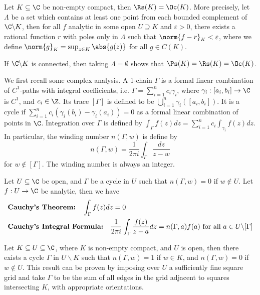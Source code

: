 \documentclass[a4paper]{article}
\begin{document}
\begin{nthm}\label{thm:Runge}
  Let $K\subseteq\C$ be non-empty compact, then $\Rs(K)=\Oc(K)$. More precisely, let $\Lambda$ be a set which contains at least one point from each bounded complement of $\C\backslash K$, then for all $f$ analytic in some open $U\supseteq K$ and $\varepsilon>0$, there exists a rational function $r$ with poles only in $\Lambda$ such that $\norm{f-r}_K<\varepsilon$, where we define $\norm{g}_K=\sup_{z\in K}\abs{g(z)}$ for all $g\in C(K)$.
\end{nthm}

\begin{remark}
  If $\C\backslash K$ is connected, then taking $\Lambda=\emptyset$ shows that $\Ps(K)=\Rs(K)=\Oc(K)$.
\end{remark}

We first recall some complex analysis. A 1-chain $\Gamma$ is a formal linear combination of $C^1$-paths with integral coefficients, i.e. $\Gamma=\sum_{i=1}^n c_i\gamma_i$, where $\gamma_i:[a_i,b_i]\to\C$ is $C^1$, and $c_i\in\Z$. Its trace $[\Gamma]$ is defined to be $\bigcup_{i=1}^n\gamma_i([a_i,b_i])$. It is a cycle if $\sum_{i=1}^n c_i(\gamma_i(b_i)-\gamma_i(a_i))=0$ as a formal linear combination of points in $\C$. Integration over $\Gamma$ is defined by $\int_\Gamma f(z)dz=\sum_{i=1}^n c_i\int_{\gamma_i}f(z)dz$. In particular, the winding number $n(\Gamma,w)$ is define by
\[n(\Gamma,w)=\frac{1}{2\pi i}\int_\Gamma\frac{dz}{z-w}\]
for $w\notin[\Gamma]$. The winding number is always an integer.

Let $U\subseteq\C$ be open, and $\Gamma$ be a cycle in $U$ such that $n(\Gamma,w)=0$ if $w\notin U$. Let $f:U\to\C$ be analytic, then we have
\begin{align*}
	& \text{\bfseries Cauchy's Theorem:}\quad \int_\Gamma f(z)dz=0\\
	& \text{\bfseries Cauchy's Integral Formula:}\quad\frac{1}{2\pi i}\int_\Gamma\frac{f(z)}{z-a}dz=n(\Gamma,a)f(a)\text{ for all }a\in U\backslash[\Gamma]
\end{align*}

Let $K\subseteq U\subseteq\C$, where $K$ is non-empty compact, and $U$ is open, then there exists a cycle $\Gamma$ in $U\backslash K$ such that $n(\Gamma,w)=1$ if $w\in K$, and $n(\Gamma,w)=0$ if $w\notin U$. This result can be proven by imposing over $U$ a sufficiently fine square grid and take $\Gamma$ to be the sum of all edges in the grid adjacent to squares intersecting $K$, with appropriate orientations.
\end{document}
